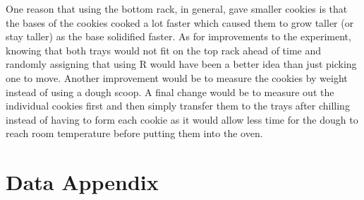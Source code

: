 \documentclass[paper=a4, fontsize=11pt]{scrartcl} %
\numberwithin{equation}{section} %
\numberwithin{figure}{section} %
\numberwithin{table}{section} %
\begin{document}
One reason that using the bottom rack, in general, gave smaller cookies is that the bases of the cookies cooked a lot faster which caused them to grow taller (or stay taller) as the base solidified faster. As for improvements to the experiment, knowing that both trays would not fit on the top rack ahead of time and randomly assigning that using R would have been a better idea than just picking one to move. Another improvement would be to measure the cookies by weight instead of using a dough scoop. A final change would be to measure out the individual cookies first and then simply transfer them to the trays after chilling instead of having to form each cookie as it would allow less time for the dough to reach room temperature before putting them into the oven.



\newpage
\section*{Data Appendix}
\end{document}
